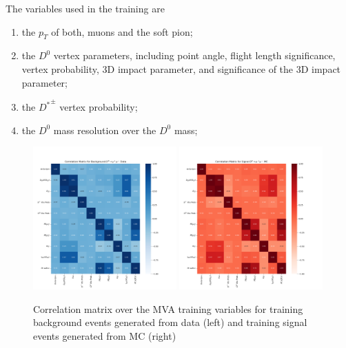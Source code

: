 The variables used in the training are
\begin{enumerate}
    \item the $p_T$ of both, muons and the soft pion;
    \item the $D^0$ vertex parameters, including point angle, flight length significance, vertex probability, 3D impact parameter, and significance of the 3D impact parameter;
    \item the ${D^*}^\pm$ vertex probability;
    \item the $D^0$ mass resolution over the $D^0$ mass;
\end{enumerate}

\begin{figure}[htp]
    \begin{center}
      \includegraphics[width=0.49\textwidth]{figures/chapter4/mva/Correlation_data.png}
      \includegraphics[width=0.49\textwidth]{figures/chapter4/mva/Correlation_dmm.png}\\
    \end{center}
    \caption{
      Correlation matrix over the MVA training variables for training background events generated from data (left) and training signal events generated from MC (right)
    }
    \label{fig:mva_correlation_matrix_for_training_variables}
\end{figure}

